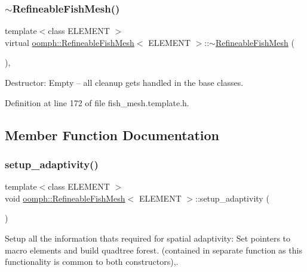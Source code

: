 \subsubsection{\texorpdfstring{$\sim$\+Refineable\+Fish\+Mesh()}{~RefineableFishMesh()}}
{\footnotesize\ttfamily template$<$class E\+L\+E\+M\+E\+NT $>$ \\
virtual \hyperlink{classoomph_1_1RefineableFishMesh}{oomph\+::\+Refineable\+Fish\+Mesh}$<$ E\+L\+E\+M\+E\+NT $>$\+::$\sim$\hyperlink{classoomph_1_1RefineableFishMesh}{Refineable\+Fish\+Mesh} (\begin{DoxyParamCaption}{ }\end{DoxyParamCaption})\hspace{0.3cm}{\ttfamily [inline]}, {\ttfamily [virtual]}}



Destructor\+: Empty -- all cleanup gets handled in the base classes. 



Definition at line 172 of file fish\+\_\+mesh.\+template.\+h.



\subsection{Member Function Documentation}
\mbox{\label{classoomph_1_1RefineableFishMesh_a1fb10f94f78c7a4e37113fbf4c72f00c}} 
\subsubsection{\texorpdfstring{setup\+\_\+adaptivity()}{setup\_adaptivity()}}
{\footnotesize\ttfamily template$<$class E\+L\+E\+M\+E\+NT $>$ \\
void \hyperlink{classoomph_1_1RefineableFishMesh}{oomph\+::\+Refineable\+Fish\+Mesh}$<$ E\+L\+E\+M\+E\+NT $>$\+::setup\+\_\+adaptivity (\begin{DoxyParamCaption}{ }\end{DoxyParamCaption})\hspace{0.3cm}{\ttfamily [protected]}}



Setup all the information that\textquotesingle{}s required for spatial adaptivity\+: Set pointers to macro elements and build quadtree forest. (contained in separate function as this functionality is common to both constructors),. 

